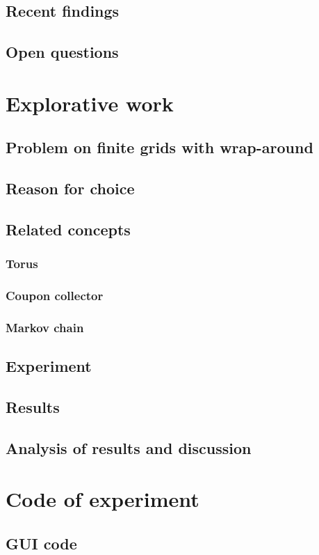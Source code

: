 \documentclass{article}
\begin{document}
\subsection{Recent findings}
\subsection{Open questions}

\section{Explorative work}
\subsection{Problem on finite grids with wrap-around}
\subsection{Reason for choice}
\subsection{Related concepts}
\subsubsection{Torus}
\subsubsection{Coupon collector}
\subsubsection{Markov chain}
\subsection{Experiment}
\subsection{Results}
\subsection{Analysis of results and discussion}

\section{Code of experiment}
\subsection{GUI code}
\end{document}
